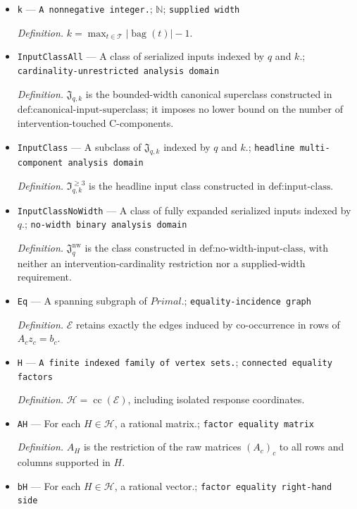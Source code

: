 \documentclass{article}
\begin{document}
\begin{itemize}
  \item \texttt{k} --- \texttt{A nonnegative integer.}; \(\mathbb N\); \texttt{supplied width}
  \par\smallskip\noindent\emph{Definition.} \(k=\max_{t\in\mathcal T}|\operatorname{bag}(t)|-1\).
  \item \texttt{InputClassAll} --- A class of serialized inputs indexed by \(q\) and \(k\).; \texttt{cardinality-\allowbreak{}unrestricted analysis domain}
  \par\smallskip\noindent\emph{Definition.} \(\mathfrak J_{q,k}\) is the bounded-width canonical superclass constructed in \(\text{def:canonical-input-superclass}\); it imposes no lower bound on the number of intervention-touched C-components.
  \item \texttt{InputClass} --- A subclass of \(\mathfrak J_{q,k}\) indexed by \(q\) and \(k\).; \texttt{headline multi-\allowbreak{}component analysis domain}
  \par\smallskip\noindent\emph{Definition.} \(\mathfrak I_{q,k}^{\ge3}\) is the headline input class constructed in \(\text{def:input-class}\).
  \item \texttt{InputClassNoWidth} --- A class of fully expanded serialized inputs indexed by \(q\).; \texttt{no-\allowbreak{}width binary analysis domain}
  \par\smallskip\noindent\emph{Definition.} \(\mathfrak J_q^{\mathrm{nw}}\) is the class constructed in \(\text{def:no-width-input-class}\), with neither an intervention-cardinality restriction nor a supplied-width requirement.
  \item \texttt{Eq} --- A spanning subgraph of \(Primal\).; \texttt{equality-\allowbreak{}incidence graph}
  \par\smallskip\noindent\emph{Definition.} \(\mathcal E\) retains exactly the edges induced by co-occurrence in rows of \(A_cz_c=b_c\).
  \item \texttt{H} --- \texttt{A finite indexed family of vertex sets.}; \texttt{connected equality factors}
  \par\smallskip\noindent\emph{Definition.} \(\mathcal H=\operatorname{cc}(\mathcal E)\), including isolated response coordinates.
  \item \texttt{AH} --- For each \(H\in\mathcal H\), a rational matrix.; \texttt{factor equality matrix}
  \par\smallskip\noindent\emph{Definition.} \(A_H\) is the restriction of the raw matrices \((A_c)_c\) to all rows and columns supported in \(H\).
  \item \texttt{bH} --- For each \(H\in\mathcal H\), a rational vector.; \texttt{factor equality right-\allowbreak{}hand side}

\end{itemize}
\end{document}
